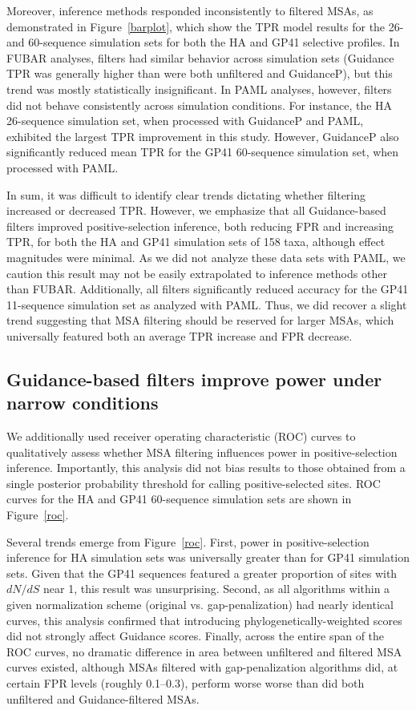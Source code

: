 \documentclass[11pt]{article}
\begin{document}
Moreover, inference methods responded inconsistently to filtered MSAs, as demonstrated in Figure~\ref{barplot}, which show the TPR model results for the 26- and 60-sequence simulation sets for both the HA and GP41 selective profiles. In FUBAR analyses, filters had similar behavior across simulation sets (Guidance TPR was generally higher than were both unfiltered and GuidanceP), but this trend was mostly statistically insignificant. In PAML analyses, however, filters did not behave consistently across simulation conditions. For instance, the HA 26-sequence simulation set, when processed with GuidanceP and PAML, exhibited the largest TPR improvement in this study. However, GuidanceP also significantly reduced mean TPR for the GP41 60-sequence simulation set, when processed with PAML. 

In sum, it was difficult to identify clear trends dictating whether filtering increased or decreased TPR. However, we emphasize that all Guidance-based filters improved positive-selection inference, both reducing FPR and increasing TPR, for both the HA and GP41 simulation sets of 158 taxa, although effect magnitudes were minimal. As we did not analyze these data sets with PAML, we caution this result may not be easily extrapolated to inference methods other than FUBAR. Additionally, all filters significantly reduced accuracy for the GP41 11-sequence simulation set as analyzed with PAML. Thus, we did recover a slight trend suggesting that MSA filtering should be reserved for larger MSAs, which universally featured both an average TPR increase and FPR decrease.

\subsection*{Guidance-based filters improve power under narrow conditions}

We additionally used receiver operating characteristic (ROC) curves to qualitatively assess whether MSA filtering influences power in positive-selection inference. Importantly, this analysis did not bias results to those obtained from a single posterior probability threshold for calling positive-selected sites. ROC curves for the HA and GP41 60-sequence simulation sets are shown in Figure~\ref{roc}. 

Several trends emerge from Figure~\ref{roc}. First, power in positive-selection inference for HA simulation sets was universally greater than for GP41 simulation sets. Given that the GP41 sequences featured a greater proportion of sites with $dN/dS$ near 1, this result was unsurprising. Second, as all algorithms within a given normalization scheme (original vs. gap-penalization) had nearly identical curves, this analysis confirmed that introducing phylogenetically-weighted scores did not strongly affect Guidance scores. Finally, across the entire span of the ROC curves, no dramatic difference in area between unfiltered and filtered MSA curves existed, although MSAs filtered with gap-penalization algorithms did, at certain FPR levels (roughly 0.1--0.3), perform worse worse than did both unfiltered and Guidance-filtered MSAs. 
\end{document}
